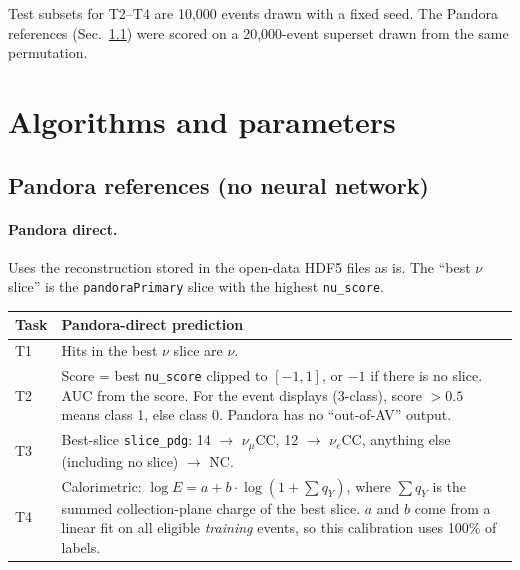 \documentclass[11pt,a4paper]{article}
\newcommand{\nue}{\ensuremath{\nu_e}}
\newcommand{\numu}{\ensuremath{\nu_\mu}}
\newcommand{\code}[1]{\texttt{\small #1}}
\begin{document}
Test subsets for T2--T4 are 10{,}000 events drawn with a fixed seed. The Pandora references (Sec.~\ref{sec:pandora}) were scored on a 20{,}000-event superset drawn from the same permutation.

\section{Algorithms and parameters}\label{sec:algs}
\subsection{Pandora references (no neural network)}\label{sec:pandora}
\paragraph{Pandora direct.} Uses the reconstruction stored in the open-data HDF5 files as is. The ``best $\nu$ slice'' is the \code{pandoraPrimary} slice with the highest \code{nu\_score}.
\begin{center}\small
\begin{tabularx}{\textwidth}{lL}
\toprule
Task & Pandora-direct prediction\\
\midrule
T1 & Hits in the best $\nu$ slice are $\nu$.\\
T2 & Score = best \code{nu\_score} clipped to $[-1,1]$, or $-1$ if there is no slice. AUC from the score. For the event displays (3-class), score $>0.5$ means class 1, else class 0. Pandora has no ``out-of-AV'' output.\\
T3 & Best-slice \code{slice\_pdg}: 14 $\to$ \numu CC, 12 $\to$ \nue CC, anything else (including no slice) $\to$ NC.\\
T4 & Calorimetric: $\log E = a + b\cdot\log(1+\sum q_Y)$, where $\sum q_Y$ is the summed collection-plane charge of the best slice. $a$ and $b$ come from a linear fit on all eligible \emph{training} events, so this calibration uses 100\% of labels.\\
\bottomrule
\end{tabularx}
\end{center}
\end{document}
